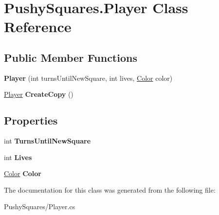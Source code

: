 \hypertarget{class_pushy_squares_1_1_player}{}\section{Pushy\+Squares.\+Player Class Reference}
\label{class_pushy_squares_1_1_player}
\subsection*{Public Member Functions}
\begin{DoxyCompactItemize}
\item 
\mbox{\label{class_pushy_squares_1_1_player_ab0ae16d21e337e71133da6c5ea2d8dbb}} 
{\bfseries Player} (int turns\+Until\+New\+Square, int lives, \hyperlink{namespace_pushy_squares_a456c990da0c8e2089c171d31f7e27574}{Color} color)
\item 
\mbox{\label{class_pushy_squares_1_1_player_a79e273e050d0b3fc98b332b266846942}} 
\hyperlink{class_pushy_squares_1_1_player}{Player} {\bfseries Create\+Copy} ()
\end{DoxyCompactItemize}
\subsection*{Properties}
\begin{DoxyCompactItemize}
\item 
\mbox{\label{class_pushy_squares_1_1_player_a799fbb41e4838d82910035b2a36478c6}} 
int {\bfseries Turns\+Until\+New\+Square}
\item 
\mbox{\label{class_pushy_squares_1_1_player_a6d199437345c49ff20f11a85f2b13f66}} 
int {\bfseries Lives}
\item 
\mbox{\label{class_pushy_squares_1_1_player_a8b133120288eeafd346d0e2f5f226eb6}} 
\hyperlink{namespace_pushy_squares_a456c990da0c8e2089c171d31f7e27574}{Color} {\bfseries Color}
\end{DoxyCompactItemize}


The documentation for this class was generated from the following file\+:\begin{DoxyCompactItemize}
\item 
Pushy\+Squares/Player.\+cs\end{DoxyCompactItemize}
